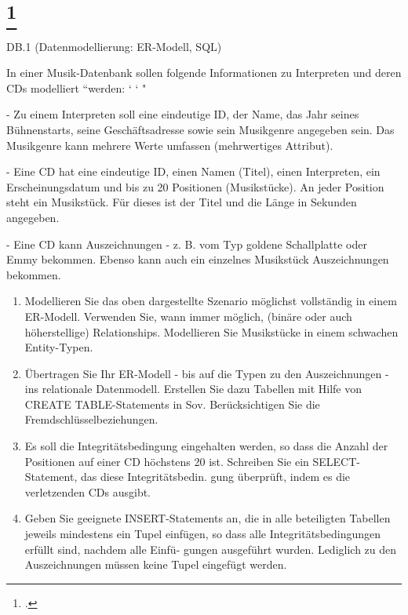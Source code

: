 \documentclass{lehramt-informatik-aufgabe}
\begin{document}
\liAufgabenTitel{}
\section{
\footcite{66116:2015:03}}

DB.1 (Datenmodellierung: ER-Modell, SQL)

In einer Musik-Datenbank sollen folgende Informationen zu Interpreten und deren CDs modelliert
“werden: ‘ ‘ "

- Zu einem Interpreten soll eine eindeutige ID, der Name, das Jahr seines Bühnenstarts, seine Geschäftsadresse sowie sein Musikgenre angegeben sein. Das Musikgenre kann mehrere Werte umfassen (mehrwertiges Attribut).

- Eine CD hat eine eindeutige ID, einen Namen (Titel), einen Interpreten, ein Erscheinungsdatum
und bis zu 20 Positionen (Musikstücke). An jeder Position steht ein Musikstück. Für dieses ist der
Titel und die Länge in Sekunden angegeben.

- Eine CD kann Auszeichnungen - z. B. vom Typ goldene Schallplatte oder Emmy bekommen.
Ebenso kann auch ein einzelnes Musikstück Auszeichnungen bekommen.

\begin{enumerate}


\item  Modellieren Sie das oben dargestellte Szenario möglichst
vollständig in einem ER-Modell. Verwenden Sie, wann immer möglich,
(binäre oder auch höherstellige) Relationships. Modellieren Sie
Musikstücke in einem schwachen Entity-Typen.


\item Übertragen Sie Ihr ER-Modell - bis auf die Typen zu den
Auszeichnungen - ins relationale Datenmodell. Erstellen Sie dazu
Tabellen mit Hilfe von CREATE TABLE-Statements in Sov. Berücksichtigen
Sie die Fremdschlüsselbeziehungen.


\item Es soll die Integritätsbedingung eingehalten werden, so dass die
Anzahl der Positionen auf einer CD höchstens 20 ist. Schreiben Sie ein
SELECT-Statement, das diese Integritätsbedin. gung überprüft, indem es
die verletzenden CDs ausgibt.


\item Geben Sie geeignete INSERT-Statements an, die in alle beteiligten
Tabellen jeweils mindestens ein Tupel einfügen, so dass alle
Integritätsbedingungen erfüllt sind, nachdem alle Einfü- gungen
ausgeführt wurden. Lediglich zu den Auszeichnungen müssen keine Tupel
eingefügt werden.
\end{enumerate}
\end{document}
